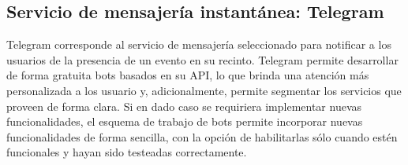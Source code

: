 \subsection{Servicio de mensajería instantánea: Telegram}

Telegram corresponde al servicio de mensajería seleccionado para notificar a los usuarios de la presencia de un evento en su recinto. Telegram permite desarrollar de forma gratuita bots basados en su API, lo que brinda una atención más personalizada a los usuario y, adicionalmente, permite segmentar los servicios que proveen de forma clara. Si en dado caso se requiriera implementar nuevas funcionalidades, el esquema de trabajo de bots permite incorporar nuevas funcionalidades de forma sencilla, con la opción de habilitarlas sólo cuando estén funcionales y hayan sido testeadas correctamente.

